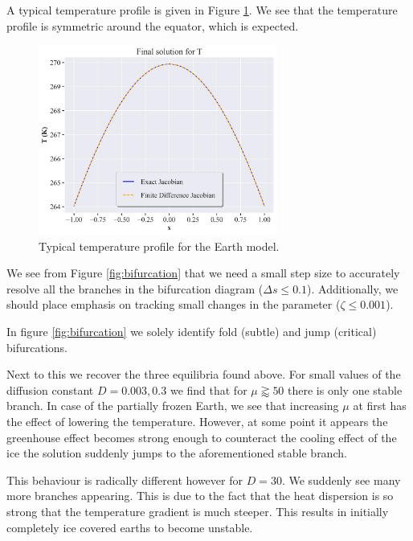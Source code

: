     A typical temperature profile is given in Figure \ref{fig:temperature_profile}. We see that the temperature profile is symmetric around the equator, which is expected.
    \begin{figure}[H]
        \centering
        \includegraphics[width=0.7\textwidth]{figures/equilibrium_T.png}
        \caption{Typical temperature profile for the Earth model.}
        \label{fig:temperature_profile}
    \end{figure}

    We see from Figure \ref{fig:bifurcation} that we need a small step size to accurately resolve all the branches in the bifurcation diagram ($\Delta s \leq 0.1$).
    Additionally, we should place emphasis on tracking small changes in the parameter ($\zeta \leq 0.001$).

    In figure \ref{fig:bifurcation} we solely identify fold (subtle) and jump (critical) bifurcations.
    
    Next to this we recover the three equilibria found above. For small values of the diffusion constant $D=0.003, 0.3$ we find that for $\mu\gtrapprox50$ there is only 
    one stable branch. In case of the partially frozen Earth, we see that increasing $\mu$ at first has the effect of lowering the temperature.
    However, at some point it appears the greenhouse effect becomes strong enough to counteract the cooling effect of the ice the solution suddenly jumps to the
    aforementioned stable branch.
    
    This behaviour is radically different however for $D=30$. We suddenly see many more branches appearing. This is due to the fact that the heat dispersion is so strong
    that the temperature gradient is much steeper. This results in initially completely ice covered earths to become unstable.


